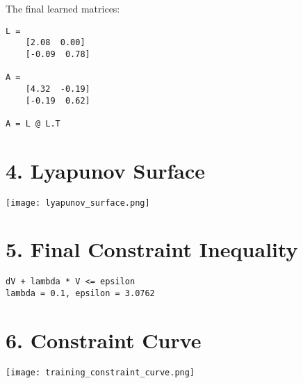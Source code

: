\documentclass[11pt]{article}
\begin{document}
The final learned matrices:
\begin{verbatim}
L = 
    [2.08  0.00]
    [-0.09  0.78]

A = 
    [4.32  -0.19]
    [-0.19  0.62]

A = L @ L.T
\end{verbatim}

\section*{4. Lyapunov Surface}
\texttt{[image: lyapunov\_surface.png]}

\section*{5. Final Constraint Inequality}
\begin{verbatim}
dV + lambda * V <= epsilon
lambda = 0.1, epsilon = 3.0762\end{verbatim}

\section*{6. Constraint Curve}
\texttt{[image: training\_constraint\_curve.png]}
\end{document}
